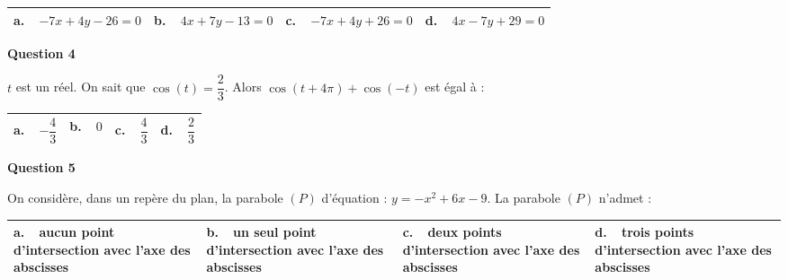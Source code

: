\documentclass[10pt]{article}
\begin{document}
\begin{center}
\begin{tabularx}{\linewidth}{|*{4}{X|}}\hline
\textbf{a.~~}$- 7x + 4y- 26= 0$&\textbf{b.~~}$4x + 7y - 13 = 0$&\textbf{c.~~}$- 7x+ 4y+ 26= 0$&\textbf{d.~~}$4x - 7y + 29 = 0$\\ \hline
\end{tabularx}
\end{center}

\textbf{Question 4}

$t$ est un réel. On sait que $\cos(t)= \dfrac{2}{3}$. Alors $\cos(t+4\pi) + \cos (-t)$ est égal à : 

\begin{center}
\begin{tabularx}{\linewidth}{|*{4}{X|}}\hline
\textbf{a.~~}$- \dfrac{4}{3}$&\textbf{b.~~}$0$&\textbf{c.~~}$\dfrac{4}{3}$&\textbf{d.~~}$\dfrac{2}{3}$\rule[-3mm]{0mm}{9mm}\\ \hline
\end{tabularx}
\end{center}

\medskip

\textbf{Question 5}

On considère, dans un repère du plan, la parabole $(P)$ d'équation : $y= - x^2 +6x - 9$. La parabole $(P)$ n'admet :

\begin{center}
\begin{tabularx}{\linewidth}{|*{4}{X|}}\hline
\textbf{a.~~}aucun point d'intersection avec l'axe des abscisses&\textbf{b.~~}un seul point d'intersection avec l'axe des abscisses&\textbf{c.~~}deux points d'intersection avec l'axe des abscisses&\textbf{d.~~}trois points d'intersection avec l'axe des abscisses\\ \hline
\end{tabularx}
\end{center}
\bigskip
\end{document}
